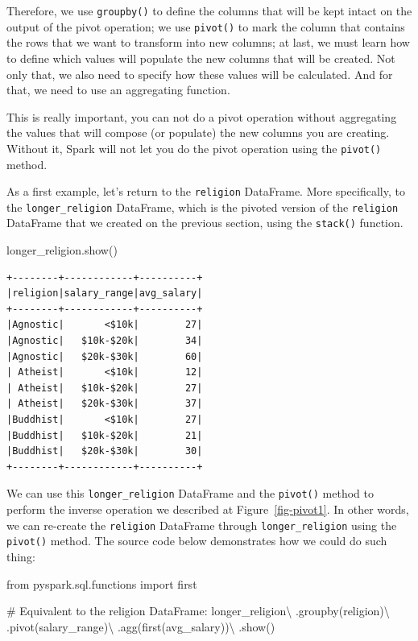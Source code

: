 \documentclass[
  11pt,
  letterpaper,
  DIV=11,
  numbers=noendperiod]{scrreprt}
\newenvironment{Shaded}{\begin{snugshade}}{\end{snugshade}}
\newcommand{\CommentTok}[1]{\textcolor[rgb]{0.37,0.37,0.37}{#1}}
\newcommand{\ImportTok}[1]{\textcolor[rgb]{0.00,0.46,0.62}{#1}}
\newcommand{\NormalTok}[1]{\textcolor[rgb]{0.00,0.23,0.31}{#1}}
\newcommand{\OperatorTok}[1]{\textcolor[rgb]{0.37,0.37,0.37}{#1}}
\newcommand{\StringTok}[1]{\textcolor[rgb]{0.13,0.47,0.30}{#1}}
\begin{document}
Therefore, we use \texttt{groupby()} to define the columns that will be
kept intact on the output of the pivot operation; we use
\texttt{pivot()} to mark the column that contains the rows that we want
to transform into new columns; at last, we must learn how to define
which values will populate the new columns that will be created. Not
only that, we also need to specify how these values will be calculated.
And for that, we need to use an aggregating function.

This is really important, you can not do a pivot operation without
aggregating the values that will compose (or populate) the new columns
you are creating. Without it, Spark will not let you do the pivot
operation using the \texttt{pivot()} method.

As a first example, let's return to the \texttt{religion} DataFrame.
More specifically, to the \texttt{longer\_religion} DataFrame, which is
the pivoted version of the \texttt{religion} DataFrame that we created
on the previous section, using the \texttt{stack()} function.

\begin{Shaded}
\begin{Highlighting}[]
\NormalTok{longer\_religion.show()}
\end{Highlighting}
\end{Shaded}

\begin{verbatim}
+--------+------------+----------+
|religion|salary_range|avg_salary|
+--------+------------+----------+
|Agnostic|       <$10k|        27|
|Agnostic|   $10k-$20k|        34|
|Agnostic|   $20k-$30k|        60|
| Atheist|       <$10k|        12|
| Atheist|   $10k-$20k|        27|
| Atheist|   $20k-$30k|        37|
|Buddhist|       <$10k|        27|
|Buddhist|   $10k-$20k|        21|
|Buddhist|   $20k-$30k|        30|
+--------+------------+----------+
\end{verbatim}

We can use this \texttt{longer\_religion} DataFrame and the
\texttt{pivot()} method to perform the inverse operation we described at
Figure~\ref{fig-pivot1}. In other words, we can re-create the
\texttt{religion} DataFrame through \texttt{longer\_religion} using the
\texttt{pivot()} method. The source code below demonstrates how we could
do such thing:

\begin{Shaded}
\begin{Highlighting}[]
\ImportTok{from}\NormalTok{ pyspark.sql.functions }\ImportTok{import}\NormalTok{ first}

\CommentTok{\# Equivalent to the \textasciigrave{}religion\textasciigrave{} DataFrame:}
\NormalTok{longer\_religion}\OperatorTok{\textbackslash{}}
\NormalTok{    .groupby(}\StringTok{\textquotesingle{}religion\textquotesingle{}}\NormalTok{)}\OperatorTok{\textbackslash{}}
\NormalTok{    .pivot(}\StringTok{\textquotesingle{}salary\_range\textquotesingle{}}\NormalTok{)}\OperatorTok{\textbackslash{}}
\NormalTok{    .agg(first(}\StringTok{\textquotesingle{}avg\_salary\textquotesingle{}}\NormalTok{))}\OperatorTok{\textbackslash{}}
\NormalTok{    .show()}
\end{Highlighting}
\end{Shaded}
\end{document}
